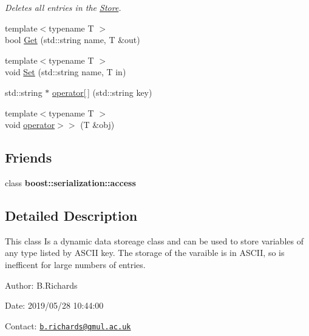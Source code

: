 \begin{DoxyCompactItemize}
\begin{DoxyCompactList}\small\item\em Deletes all entries in the \hyperlink{classStore}{Store}. \end{DoxyCompactList}\item 
{\footnotesize template$<$typename T $>$ }\\bool \hyperlink{classStore_abdc0134daa34b808328070f5d6b295f3}{Get} (std\-::string name, T \&out)
\item 
{\footnotesize template$<$typename T $>$ }\\void \hyperlink{classStore_af586739813ce18da6f5e3561d134a814}{Set} (std\-::string name, T in)
\item 
std\-::string $\ast$ \hyperlink{classStore_a790ca02bc7d11648edf0c8d5df3751fe}{operator\mbox{[}$\,$\mbox{]}} (std\-::string key)
\item 
{\footnotesize template$<$typename T $>$ }\\void \hyperlink{classStore_abe9b65d1308c43dc4158b00d6aed7385}{operator$>$$>$} (T \&obj)
\end{DoxyCompactItemize}
\subsection*{Friends}
\begin{DoxyCompactItemize}
\item 
\hypertarget{classStore_ac98d07dd8f7b70e16ccb9a01abf56b9c}{class {\bfseries boost\-::serialization\-::access}}\label{classStore_ac98d07dd8f7b70e16ccb9a01abf56b9c}

\end{DoxyCompactItemize}


\subsection{Detailed Description}
This class Is a dynamic data storeage class and can be used to store variables of any type listed by A\-S\-C\-I\-I key. The storage of the varaible is in A\-S\-C\-I\-I, so is inefficent for large numbers of entries.

\begin{DoxyParagraph}{Author\-:}
B.\-Richards 
\end{DoxyParagraph}
\begin{DoxyParagraph}{Date\-:}
2019/05/28 10\-:44\-:00 
\end{DoxyParagraph}
Contact\-: \href{mailto:b.richards@qmul.ac.uk}{\tt b.\-richards@qmul.\-ac.\-uk} 

